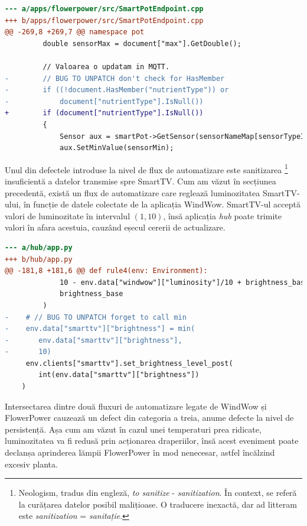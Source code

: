 \begin{lstlisting}[language=diff, caption={Lipsa validării cheilor JSON în aplicația SmartPot}]
--- a/apps/flowerpower/src/SmartPotEndpoint.cpp
+++ b/apps/flowerpower/src/SmartPotEndpoint.cpp
@@ -269,8 +269,7 @@ namespace pot
         double sensorMax = document["max"].GetDouble();
 
         // Valoarea o updatam in MQTT.
-        // BUG TO UNPATCH don't check for HasMember
-        if ((!document.HasMember("nutrientType")) or
-            document["nutrientType"].IsNull())
+        if (document["nutrientType"].IsNull())
         {
             Sensor aux = smartPot->GetSensor(sensorNameMap[sensorTypeID]);
             aux.SetMinValue(sensorMin);
\end{lstlisting}

Unul din defectele introduse la nivel de flux de automatizare este sanitizarea \footnote{Neologism, tradus din engleză, \textit{to sanitize} - \textit{sanitization}. În context, se referă la curățarea datelor posibil malițioase. O traducere inexactă, dar ad litteram este \textit{sanitization} = \textit{sanitație}.} insuficientă a datelor transmise spre SmartTV. Cum am văzut în secțiunea precedentă, există un flux de automatizare care reglează luminozitatea SmartTV-ului, în funcție de datele colectate de la aplicația WindWow. SmartTV-ul acceptă valori de luminozitate în intervalul $(1, 10)$, însă aplicația \textit{hub} poate trimite valori în afara acestuia, cauzând eșecul cererii de actualizare.

\begin{lstlisting}[language=diff, caption={Valorile luminozității transmise spre SmartTV nu sunt doar în intervalul (1, 10)}]
--- a/hub/app.py
+++ b/hub/app.py
@@ -181,8 +181,6 @@ def rule4(env: Environment):
             10 - env.data["windwow"]["luminosity"]/10 + brightness_base,
             brightness_base 
         )
-    # // BUG TO UNPATCH forget to call min
-    env.data["smarttv"]["brightness"] = min(
-       env.data["smarttv"]["brightness"], 
-       10)
     env.clients["smarttv"].set_brightness_level_post(
        int(env.data["smarttv"]["brightness"])
    )
\end{lstlisting}

Intersectarea dintre două fluxuri de automatizare legate de WindWow și FlowerPower cauzează un defect din categoria a treia, anume defecte la nivel de persistență. Așa cum am văzut în cazul unei temperaturi prea ridicate, luminozitatea va fi redusă prin acționarea draperiilor, însă acest eveniment poate declanșa aprinderea lămpii FlowerPower în mod nenecesar, astfel încălzind excesiv planta. 

